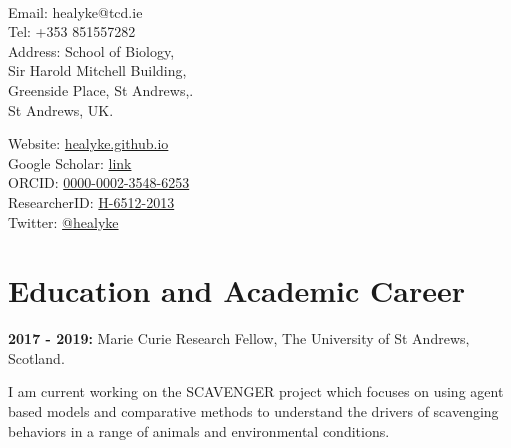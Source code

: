 \documentclass[10pt,a4paper]{article}
\begin{document}
\par{\smallskip\par}

\large{}\\
\smallskip

\par{\normalsize{}\bigskip\par}


\begin{minipage}[t]{0.5\textwidth}
\raggedright

Email:  healyke@tcd.ie\\
Tel: \hspace{0mm}+353 851557282\\
Address: School of Biology,\\
\hspace{0mm}Sir Harold Mitchell Building,\\
\hspace{0mm}Greenside Place, St Andrews,.\\ 
\hspace{0mm}St Andrews, UK.\\ 

\end{minipage}
\begin{minipage}[t]{0.45\textwidth}

Website: \href{http://healyke.github.io}{healyke.github.io}\\
Google Scholar: \href{http://scholar.google.com/citations?user=5Kb9u8EAAAAJ}{link}\\
ORCID: \href{http://orcid.org/0000-0002-3548-6253}{0000-0002-3548-6253}\\
ResearcherID: \href{http://www.researcherid.com/rid/H-6512-2013}{H-6512-2013}\\
Twitter: \href{https://twitter.com/healyke}{@healyke}\\
\end{minipage}

\bigskip

\section{Education and Academic Career}

\raggedright	
\textbf{2017 - 2019:} Marie Curie Research Fellow, The University of St Andrews, Scotland.
 \smallskip
\par{\fontsize{10.5}{10} I am current working on the SCAVENGER project which focuses on using agent based models and comparative methods to understand the drivers of scavenging behaviors in a range of animals and environmental conditions.
\bigskip}
\end{document}
